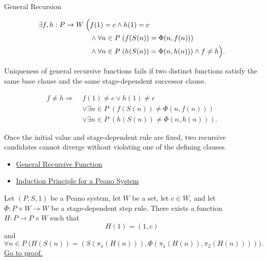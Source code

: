 \begin{topicbox}{General Recursion}
\begin{remark*}
\[
\begin{aligned}
\exists f,h:P\to W\;\Bigl(&
f(1)=c\land h(1)=c\\
&\land \forall n\in P\;(f(S(n))=\Phi(n,f(n)))\\
&\land \forall n\in P\;(h(S(n))=\Phi(n,h(n)))
\land f\neq h\Bigr).
\end{aligned}
\]
\end{remark*}

\begin{remark*}
Uniqueness of general recursive functions fails if two distinct functions
satisfy the same base clause and the same stage-dependent successor clause.
\end{remark*}

\begin{remark*}
\[
\begin{aligned}
f\neq h
\Longrightarrow\;&
f(1)\neq c\lor h(1)\neq c\\
&\lor \exists n\in P\;(f(S(n))\neq \Phi(n,f(n)))\\
&\lor \exists n\in P\;(h(S(n))\neq \Phi(n,h(n))).
\end{aligned}
\]
\end{remark*}

\begin{remark*}[Interpretation]
Once the initial value and stage-dependent rule are fixed, two recursive
candidates cannot diverge without violating one of the defining clauses.
\end{remark*}

\begin{dependencies}
\begin{itemize}
  \item \hyperref[def:general-recursive-function]{General Recursive Function}
  \item \hyperref[thm:induction-principle-for-peano-system]{Induction Principle for a Peano System}
\end{itemize}
\end{dependencies}

\begin{tcolorbox}[colback=thmbox, colframe=thmborder, arc=2pt,
  left=6pt, right=6pt, top=4pt, bottom=4pt,
  title={\small\textbf{Theorem (General Recursion by State Encoding)}},
  fonttitle=\small\bfseries]
\begin{theorem}
\label{thm:general-recursion-by-state-encoding}
Let $(P,S,1)$ be a Peano system, let $W$ be a set, let $c\in W$, and let
$\Phi:P\times W\to W$ be a stage-dependent step rule. There exists a function
$H:P\to P\times W$ such that
\[
H(1)=(1,c)
\]
and
\[
\forall n\in P\;
\bigl(H(S(n))=(S(\pi_1(H(n))),\Phi(\pi_1(H(n)),\pi_2(H(n))))\bigr).
\]
\hyperref[prf:general-recursion-by-state-encoding]{Go to proof.}
\end{theorem}
\end{tcolorbox}


\end{topicbox}
